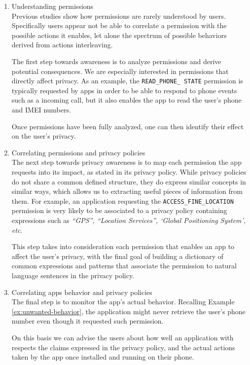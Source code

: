\begin{enumerate}
  \item Understanding permissions \hfill \\
    Previous studies \cite{Felt:2012:APU:2335356.2335360} show how permissions are rarely understood by users. Specifically users appear not be able to correlate a permission with the possible actions it enables, let alone the spectrum of possible behaviors derived from actions interleaving.

    The first step towards awareness is to analyze permissions and derive potential consequences. We are especially interested in permissions that directly affect privacy. As an example, the \texttt{READ\_PHONE\_ STATE} permission is typically requested by apps in order to be able to respond to phone events such as a incoming call, but it also enables the app to read the user's phone and IMEI numbers.

    Once permissions have been fully analyzed, one can then identify their  effect on the user's privacy.

  \item Correlating permissions and privacy policies \hfill \\
    The next step towards privacy awareness is to map each permission the app requests into its impact, as stated in its privacy policy.
    While privacy policies do not share a common defined structure, they do express similar concepts in similar ways, which allows us to extracting useful pieces of information from them. For example, an application requesting the \texttt{ACCESS\_FINE\_LOCATION} permission is very likely to be associated to a privacy policy containing expressions such as \emph{``GPS'', ``Location Services'', `Global Positioning System', etc}.

    This step takes into consideration each permission that enables an app to affect the user's privacy, with the final goal of building a dictionary of common expressions and patterns that associate the permission to natural language sentences in the privacy policy.

  \item Correlating apps behavior and privacy policies \hfill \\
    The final step is to monitor the app's actual behavior. Recalling Example \ref{ex:unwanted-behavior}, the application might never retrieve the user's phone number even though it requested such permission.

    On this basis we can advise the users about how well an application with respects the claims expressed in the privacy policy, and the actual actions taken by the app once installed and running on their phone.
\end{enumerate}

